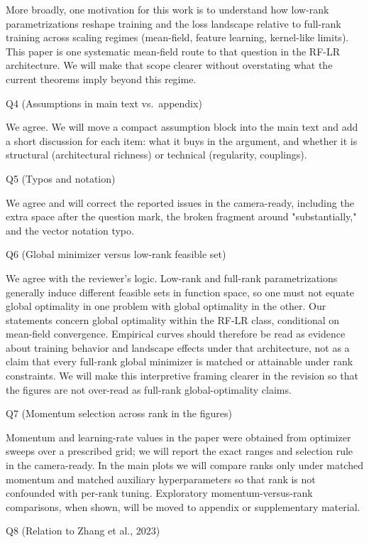 More broadly, one motivation for this work is to understand how low-rank parametrizations reshape training and the loss landscape relative to full-rank training across scaling regimes (mean-field, feature learning, kernel-like limits). This paper is one systematic mean-field route to that question in the RF-LR architecture. We will make that scope clearer without overstating what the current theorems imply beyond this regime.

Q4 (Assumptions in main text vs.\ appendix)

We agree. We will move a compact assumption block into the main text and add a short discussion for each item: what it buys in the argument, and whether it is structural (architectural richness) or technical (regularity, couplings).

Q5 (Typos and notation)

We agree and will correct the reported issues in the camera-ready, including the extra space after the question mark, the broken fragment around "substantially," and the vector notation typo.

Q6 (Global minimizer versus low-rank feasible set)

We agree with the reviewer’s logic. Low-rank and full-rank parametrizations generally induce different feasible sets in function space, so one must not equate global optimality in one problem with global optimality in the other. Our statements concern global optimality within the RF-LR class, conditional on mean-field convergence. Empirical curves should therefore be read as evidence about training behavior and landscape effects under that architecture, not as a claim that every full-rank global minimizer is matched or attainable under rank constraints. We will make this interpretive framing clearer in the revision so that the figures are not over-read as full-rank global-optimality claims.

Q7 (Momentum selection across rank in the figures)

Momentum and learning-rate values in the paper were obtained from optimizer sweeps over a prescribed grid; we will report the exact ranges and selection rule in the camera-ready. In the main plots we will compare ranks only under matched momentum and matched auxiliary hyperparameters so that rank is not confounded with per-rank tuning. Exploratory momentum-versus-rank comparisons, when shown, will be moved to appendix or supplementary material.

Q8 (Relation to Zhang et al., 2023)


